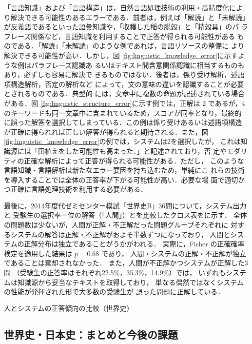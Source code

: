 \documentclass[japanese]{jnlp_1.4b}
\def\TABREF#1{}
\begin{document}
「言語知識」および「言語構造」は，自然言語処理技術の利用・高精度化によ
り解決できる可能性のあるエラーである．前者は，例えば「解読」と「未解読」
が反義語であるといった語彙知識や，「収穫した稲の脱穀」と「精穀具」のパ
ラフレーズ関係など，言語知識を利用することで正答が得られる可能性がある
ものである．「解読」「未解読」のような例であれば，言語リソースの整備に
より解決できる可能性が高い．しかし，図
\ref{fig:linguistic_knowledge_error}に示すような例はパラフレーズ認識あ
るいはテキスト間含意関係認識に相当するものもあり，必ずしも容易に解決で
きるものではない．後者は，係り受け解析，述語項構造解析，否定の解析など
によって，文の意味の違いを認識することが必要とされるものである．典型的
には，文章中に複数の命題が記述されている場合がある．図
\ref{fig:linguistic_structure_error}に示す例では，正解は 2 であるが，4
のキーワードも同一文章中に含まれているため，スコアが同率となり，最終的
に誤った解答を選択してしまっている．この例は係り受けあるいは述語項構造
が正確に得られれば正しい解答が得られると期待される．また，図
\ref{fig:linguistic_knowledge_error}の例では，システムは2を選択したが，
これは知識源には「田植えをした可能性も高まった．」と記述されており，否
定やモダリティの正確な解析によって正答が得られる可能性がある．ただし，
このような言語知識・言語解析は新たなエラー要因を持ち込むため，単純にこ
れらの技術を導入することでは全体の正答率が下がる可能性が高い．必要な場
面で適切かつ正確に言語処理技術を利用する必要がある．

最後に，2014年度代ゼミセンター模試「世界史B」36問について，システム出力と
受験生の選択率一位の解答（「人間」）とを比較したクロス表を\TABREF{tab:shakai:cross:sekaishi}に示す．
全体の問題数は少ないが，人間が正解・不正解だった問題グループそれぞれに
対するシステムの解答は正解・不正解がおよそ半数ずつになっており，
人間とシステムの正解分布は独立であることがうかがわれる．
実際に，Fisher の正確確率検定を適用した結果は $p = 0.68$ であり，
人間・システムの正解・不正解が独立であることは棄却されなかった．
また，人間が不正解かつシステムが正解した3問
（受験生の正答率はそれぞれ22.5\%，35.3\%，14.9\%）では，
いずれもシステムは知識源から妥当なテキストを取得しており，
単なる偶然ではなくシステムの性能が発揮された形で大多数の受験生が
誤った問題に正解している．

\begin{table}[t]
\caption{人とシステムの正答傾向の比較（世界史）}
\label{tab:shakai:cross:sekaishi}

\end{table}


\subsection{世界史・日本史：まとめと今後の課題}
\end{document}
